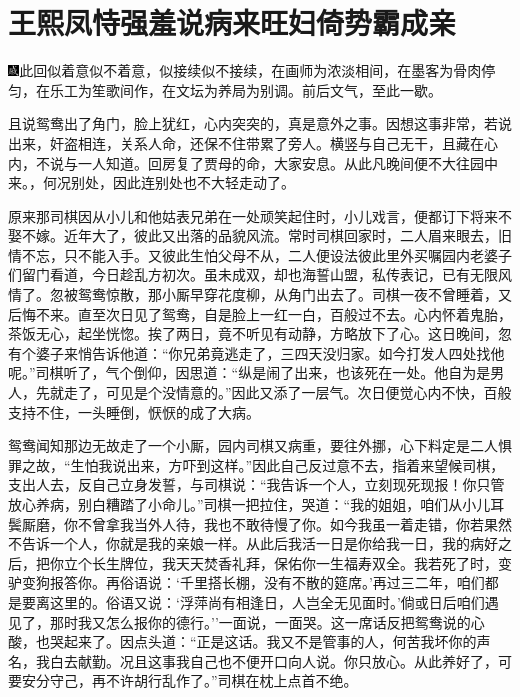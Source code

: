 \chapter{王熙凤恃强羞说病\hspace{.5em}来旺妇倚势霸成亲}

{\includegraphics[width=3mm]{../Images/00005}\kaishu 此回似着意似不着意，似接续似不接续，在画师为浓淡相间，在墨客为骨肉停匀，在乐工为笙歌间作，在文坛为养局为别调。前后文气，至此一歇。}

且说鸳鸯出了角门，脸上犹红，心内突突的，真是意外之事。因想这事非常，若说出来，奸盗相连，关系人命，还保不住带累了旁人。横竖与自己无干，且藏在心内，不说与一人知道。回房复了贾母的命，大家安息。从此凡晚间便不大往园中来。，何况别处，因此连别处也不大轻走动了。

原来那司棋因从小儿和他姑表兄弟在一处顽笑起住时，小儿戏言，便都订下将来不娶不嫁。近年大了，彼此又出落的品貌风流。常时司棋回家时，二人眉来眼去，旧情不忘，只不能入手。又彼此生怕父母不从，二人便设法彼此里外买嘱园内老婆子们留门看道，今日趁乱方初次。虽未成双，却也海誓山盟，私传表记，已有无限风情了。忽被鸳鸯惊散，那小厮早穿花度柳，从角门出去了。司棋一夜不曾睡着，又后悔不来。直至次日见了鸳鸯，自是脸上一红一白，百般过不去。心内怀着鬼胎，茶饭无心，起坐恍惚。挨了两日，竟不听见有动静，方略放下了心。这日晚间，忽有个婆子来悄告诉他道：``你兄弟竟逃走了，三四天没归家。如今打发人四处找他呢。''司棋听了，气个倒仰，因思道：``纵是闹了出来，也该死在一处。他自为是男人，先就走了，可见是个没情意的。''因此又添了一层气。次日便觉心内不快，百般支持不住，一头睡倒，恹恹的成了大病。

鸳鸯闻知那边无故走了一个小厮，园内司棋又病重，要往外挪，心下料定是二人惧罪之故，``生怕我说出来，方吓到这样。''因此自己反过意不去，指着来望候司棋，支出人去，反自己立身发誓，与司棋说：``我告诉一个人，立刻现死现报！你只管放心养病，别白糟踏了小命儿。''司棋一把拉住，哭道：``我的姐姐，咱们从小儿耳鬓厮磨，你不曾拿我当外人待，我也不敢待慢了你。如今我虽一着走错，你若果然不告诉一个人，你就是我的亲娘一样。从此后我活一日是你给我一日，我的病好之后，把你立个长生牌位，我天天焚香礼拜，保佑你一生福寿双全。我若死了时，变驴变狗报答你。再俗语说：`千里搭长棚，没有不散的筵席。'再过三二年，咱们都是要离这里的。俗语又说：`浮萍尚有相逢日，人岂全无见面时。'倘或日后咱们遇见了，那时我又怎么报你的德行。''一面说，一面哭。这一席话反把鸳鸯说的心酸，也哭起来了。因点头道：``正是这话。我又不是管事的人，何苦我坏你的声名，我白去献勤。况且这事我自己也不便开口向人说。你只放心。从此养好了，可要安分守己，再不许胡行乱作了。''司棋在枕上点首不绝。

